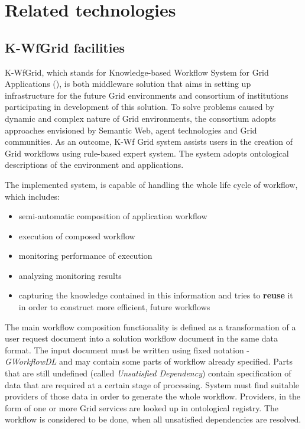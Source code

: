 
\section{Related technologies} 

\subsection{K-WfGrid facilities}

\label{ssec:kwfgrid}

K-WfGrid, which stands for Knowledge-based Workflow System for Grid Applications (\cite{KWfGrid1, flow-cgw04, wct-kwf-book-07}), is both middleware solution that aims in setting up infrastructure for the future Grid environments and consortium of institutions participating in development of this solution. To solve problems caused by dynamic and complex nature of Grid environments, the consortium adopts approaches envisioned by Semantic Web, agent technologies and Grid communities. As an outcome, K-Wf Grid system assists users in the creation of Grid workflows using rule-based expert system. The system adopts ontological descriptions of the environment and applications.

The implemented system, is capable of handling the whole life cycle of workflow, which includes:

\begin{itemize}

\item{semi-automatic composition of application workflow} \item{execution of composed workflow} \item{monitoring performance of execution} \item{analyzing monitoring results} \item{capturing the knowledge contained in this information and tries to {\bf reuse} it in order to construct more efficient, future workflows} \end{itemize}

The main workflow composition functionality is defined as a transformation of a user request document into a solution workflow document in the same data format. The input document must be written using fixed notation - \emph{GWorkflowDL} and may contain some parts of workflow already specified. Parts that are still undefined (called \emph{Unsatisfied Dependency}) contain specification of data that are required at a certain stage of processing. System must find suitable providers of those data in order to generate the whole workflow. Providers, in the form of one or more Grid services are looked up in ontological registry. The workflow is considered to be done, when all unsatisfied dependencies are resolved.


